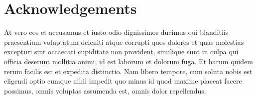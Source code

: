 \section{Acknowledgements}
At vero eos et accusamus et iusto odio dignissimos ducimus qui blanditiis praesentium voluptatum deleniti atque corrupti quos dolores et quas molestias excepturi sint occaecati cupiditate non provident, similique sunt in culpa qui officia deserunt mollitia animi, id est laborum et dolorum fuga. Et harum quidem rerum facilis est et expedita distinctio. Nam libero tempore, cum soluta nobis est eligendi optio cumque nihil impedit quo minus id quod maxime placeat facere possimus, omnis voluptas assumenda est, omnis dolor repellendus.






